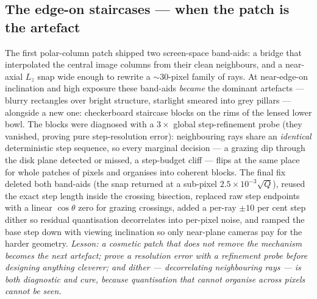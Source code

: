 \subsection{The edge-on staircases — when the patch is the artefact}
\label{sec:edgeonstaircase}
The first polar-column patch shipped two screen-space band-aids: a
bridge that interpolated the central image columns from their clean
neighbours, and a near-axial $L_z$ snap wide enough to rewrite a
$\sim$30-pixel family of rays. At near-edge-on inclination and high
exposure these band-aids \emph{became} the dominant artefacts —
blurry rectangles over bright structure, starlight smeared into grey
pillars — alongside a new one: checkerboard staircase blocks on the
rims of the lensed lower bowl. The blocks were diagnosed with a
$3\times$ global step-refinement probe (they vanished, proving pure
step-resolution error): neighbouring rays share an \emph{identical}
deterministic step sequence, so every marginal decision — a grazing
dip through the disk plane detected or missed, a step-budget cliff —
flips at the same place for whole patches of pixels and organises
into coherent blocks. The final fix deleted both band-aids (the snap
returned at a sub-pixel $2.5\times10^{-3}\sqrt{Q}$), reused the exact
step length inside the crossing bisection, replaced raw step
endpoints with a linear $\cos\theta$ zero for grazing crossings,
added a per-ray $\pm10$ per cent step dither so residual quantisation
decorrelates into per-pixel noise, and ramped the base step down with
viewing inclination so only near-plane cameras pay for the harder
geometry. \emph{Lesson: a cosmetic patch that does not remove the
mechanism becomes the next artefact; prove a resolution error with a
refinement probe before designing anything cleverer; and dither —
decorrelating neighbouring rays — is both diagnostic and cure,
because quantisation that cannot organise across pixels cannot be
seen.}

